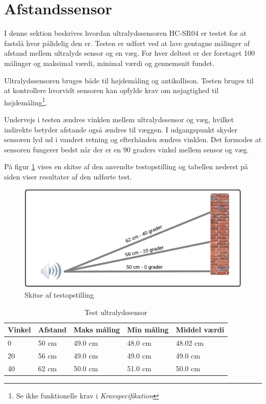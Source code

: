 \section{Afstandssensor}

I denne sektion beskrives hvordan ultralydssensoren HC-SR04 er testet for at fastslå hvor pålidelig den er. Testen er udført ved at lave gentagne målinger af afstand mellem ultralyds sensor og en væg. For hver deltest er der foretaget 100 målinger og maksimal værdi, minimal værdi og gennemsnit fundet. 

Ultralydssensoren bruges både til højdemåling og antikollison. Testen bruges til at kontrollere hvorvidt sensoren kan opfylde krav om nøjagtighed til højdemåling\footnote{Se ikke funktionelle krav i \textit{Kravspecifikation}}. 

Undervejs i testen ændres vinklen mellem ultralydssensor og væg, hvilket indirekte betyder afstande også ændres til væggen. I udgangspunkt skyder sensoren lyd ud i vandret retning og efterhånden ændres vinklen. Det formodes at sensoren fungerer bedst når der er en 90 graders vinkel mellem sensor og væg. 

På figur \ref{fig:ultra_testopstilling} vises en skitse af den anvendte testopstilling og tabellen nederst på siden viser resultater af den udførte test.

\begin{figure}[H]
\centering
\includegraphics[width=1\textwidth]{Billeder/Test/ultrasound.png}
\caption{Skitse af testopstilling}
\label{fig:ultra_testopstilling}
\end{figure}

\vspace{0.5cm}

\begin{table}[H]
\begin{tabular}{| p{2.5cm}| p{2.5cm}| p{2.5cm}| p{2.5cm}| p{2.5cm}|}
\hline
\textbf{Vinkel} & \textbf{Afstand} & \textbf{Maks måling} & \textbf{Min måling}  & \textbf{Middel værdi} \\ \hline
0 & 50 cm & 49.0 cm & 48.0 cm  & 48.02 cm \\ \hline
20 & 56 cm & 49.0 cm & 49.0 cm  & 49.0 cm \\ \hline
40 & 62 cm & 50.0 cm & 51.0 cm  & 50.0 cm \\ \hline

\end{tabular}
\caption{Test ultralydssensor}
\label{tab:Ultralyds_test}
\end{table}


